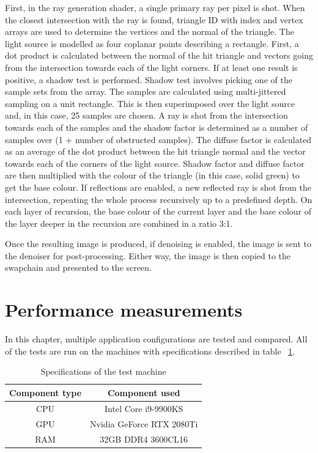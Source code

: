 \documentclass[times, utf8, zavrsni, numeric]{fer}
\begin{document}
First, in the ray generation shader, a single primary ray per pixel is shot. When the closest intersection with the ray is found, triangle ID with index and vertex arrays are used to determine the vertices and the normal of the triangle. The light source is modelled as four coplanar points describing a rectangle. First, a dot product is calculated between the normal of the hit triangle and vectors going from the intersection towards each of the light corners. If at least one result is positive, a shadow test is performed.
Shadow test involves picking one of the sample sets from the array. The samples are calculated using multi-jittered sampling \cite{ray_tracing} on a unit rectangle. This is then superimposed over the light source and, in this case, 25 samples are chosen. A ray is shot from the intersection towards each of the samples and the shadow factor is determined as a number of samples over (1 + number of obstructed samples). The diffuse factor is calculated as an average of the dot product between the hit triangle normal and the vector towards each of the corners of the light source. Shadow factor and diffuse factor are then multiplied with the colour of the triangle (in this case, solid green) to get the base colour. If reflections are enabled, a new reflected ray is shot from the intersection, repeating the whole process recursively up to a predefined depth. On each layer of recursion, the base colour of the current layer and the base colour of the layer deeper in the recursion are combined in a ratio 3:1.

Once the resulting image is produced, if denoising is enabled, the image is sent to the denoiser for post-processing. Either way, the image is then copied to the swapchain and presented to the screen.

\section{Performance measurements}
In this chapter, multiple application configurations are tested and compared. All of the tests are run on the machines with specifications described in table ~\ref{table:specifications}.

\begin{table}[H]
\begin{center}
\caption{Specifications of the test machine}
\begin{tabular}{|c|c|}
\hline
Component type & Component used \\
\hline
CPU & Intel Core i9-9900KS \\
\hline
GPU & Nvidia GeForce RTX 2080Ti \\
\hline
RAM & 32GB DDR4 3600CL16 \\
\hline
\end{tabular}
\label{table:specifications}
\end{center}
\end{table}
\end{document}
